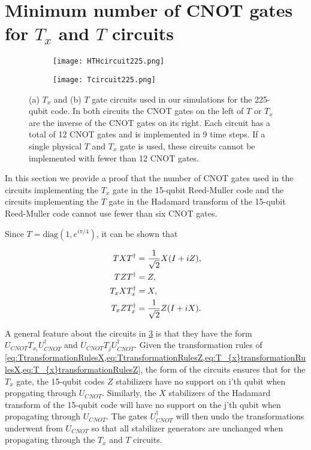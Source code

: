 \documentclass[pra,longbibliography,twocolumn,showpacs,nofootinbib,superscriptaddress,notitlepage]{revtex4-1}
\begin{document}
\section{Minimum number of CNOT gates for $T_{x}$ and $T$ circuits}
\label{app:MinCNOTforTandHTH}

\begin{figure}[h]%
\centering
\begin{subfigure}{0.35\textwidth}
\texttt{[image: HTHcircuit225.png]}
\caption{}
\label{fig:HTHcircuit225}
\end{subfigure}
\begin{subfigure}{0.4\textwidth}
\texttt{[image: Tcircuit225.png]}
\caption{}
\label{fig:Tcircuit225}
\end{subfigure}
\caption{ (a) $T_{x}$ and (b) $T$ gate circuits used in our simulations for the 225-qubit code. In both circuits the CNOT gates on the left of $T$ or $T_{x}$ are the inverse of the CNOT gates on its right. Each circuit has a total of 12 CNOT gates and is implemented in 9 time steps. If a single physical $T$ and $T_{x}$ gate is used, these circuits cannot be implemented with fewer than 12 CNOT gates.}
\label{fig:TandHTHcircuits}
\end{figure}

In this section we provide a proof that the number of CNOT gates used in the circuits implementing the $T_{x}$ gate in the 15-qubit Reed-Muller code and the circuits implementing the $T$ gate in the Hadamard transform of the 15-qubit Reed-Muller code cannot use fewer than six CNOT gates.

Since $T=\mathrm{diag}(1,e^{i\pi/4})$, it can be shown that 

\begin{align}
TXT^{\dagger} &= \frac{1}{\sqrt{2}}X(I+iZ), \label{eq:TtransformationRulesX} \\
TZT^{\dagger} &= Z, \label{eq:TtransformationRulesZ} \\
T_{x}XT_{x}^{\dagger} &= X, \label{eq:T_{x}transformationRulesX} \\
T_{x}ZT_{x}^{\dagger} &= \frac{1}{\sqrt{2}}Z(I+iX). \label{eq:T_{x}transformationRulesZ}
\end{align}

A general feature about the circuits in \cref{fig:TandHTHcircuits} is that they have the form $U_{CNOT}T_{x_{i}}U_{CNOT}^{\dagger}$ and $U_{CNOT}T_{j}U_{CNOT}^{\dagger}$. Given the transformation rules of \cref{eq:TtransformationRulesX,eq:TtransformationRulesZ,eq:T_{x}transformationRulesX,eq:T_{x}transformationRulesZ}, the form of the circuits ensures that for the $T_{x}$ gate, the 15-qubit codes $Z$ stabilizers have no support on i'th qubit when propgating through $U_{CNOT}$. Similarly, the $X$ stabilizers of the Hadamard transform of the 15-qubit code will have no support on the j'th qubit when propagating through $U_{CNOT}$. The gates $U_{CNOT}^{\dagger}$ will then undo the transformations underwent from $U_{CNOT}$ so that all stabilizer generators are unchanged when propagating through the $T_{x}$ and $T$ circuits. 
\end{document}
